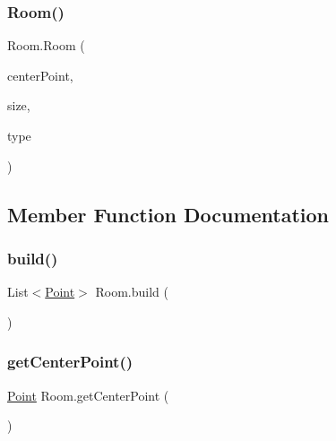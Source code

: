 \subsubsection{\texorpdfstring{Room()}{Room()}}
{\footnotesize\ttfamily Room.\+Room (\begin{DoxyParamCaption}\item[{\mbox{\hyperlink{class_point}{Point}}}]{center\+Point,  }\item[{\mbox{\hyperlink{_rooms_enum_8cs_a7eb4c91eb68aa4d08f6f9afb7f9d36ed}{Rooms\+Size}}}]{size,  }\item[{\mbox{\hyperlink{_rooms_enum_8cs_af355bc855a8786ab3e2c551d0f786ae1}{Rooms\+Type}}}]{type }\end{DoxyParamCaption})}



\subsection{Member Function Documentation}
\mbox{\label{class_room_a5f84f542feea82f8a0db07bb2edfc487}} 
\subsubsection{\texorpdfstring{build()}{build()}}
{\footnotesize\ttfamily List$<$\mbox{\hyperlink{class_point}{Point}}$>$ Room.\+build (\begin{DoxyParamCaption}{ }\end{DoxyParamCaption})}

\mbox{\label{class_room_af810d97e62205a361909549d2bc797c8}} 
\subsubsection{\texorpdfstring{get\+Center\+Point()}{getCenterPoint()}}
{\footnotesize\ttfamily \mbox{\hyperlink{class_point}{Point}} Room.\+get\+Center\+Point (\begin{DoxyParamCaption}{ }\end{DoxyParamCaption})}

\mbox{\label{class_room_a90b8e2622989c944fa5741cf49f1570a}} 
